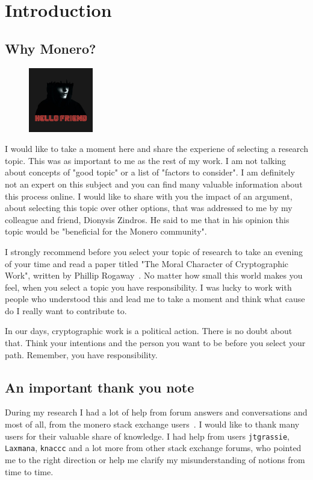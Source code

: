 \setcounter{chapter}{-1}
\chapter{Introduction}
%
\section{Why Monero?}
\setlength{\intextsep}{0pt}
\begin{figure}
\centering
\includegraphics[width=0.25\textwidth]{Images/Introduction/hello.jpg}
\end{figure}
I would like to take a moment here and share the experiene of selecting a research topic. This was as important to me as the rest of my work. I am not talking about concepts of "good topic" or a list of "factors to consider". I am definitely not an expert on this subject and you can find many valuable information about this process online. I would like to share with you the impact of an argument, about selecting this topic over other options, that was addressed to me by my colleague and friend, Dionysis Zindros. He said to me that in his opinion this topic would be "beneficial for the Monero community".

I strongly recommend before you select your topic of research to take an evening of your time and read a paper titled "The Moral Character of Cryptographic Work", written by Phillip Rogaway~\cite{moral}. No matter how small this world makes you feel, when you select a topic you have responsibility. I was lucky to work with people who understood this and lead me to take a moment and think what cause do I really want to contribute to.

In our days, cryptographic work is a political action. There is no doubt about that. Think your intentions and the person you want to be before you select your path. Remember, you have responsibility.
%
\section{An important thank you note}
During my research I had a lot of help from forum answers and conversations and most of all, from the monero stack exchange users~\cite{stackexchange}. I would like to thank many users for their valuable share of knowledge. I had help from users \verb|jtgrassie|, \verb|Laxmana|, \verb|knaccc| and a lot more from other stack exchange forums, who pointed me to the right direction or help me clarify my misunderstanding of notions from time to time.
\pagebreak


